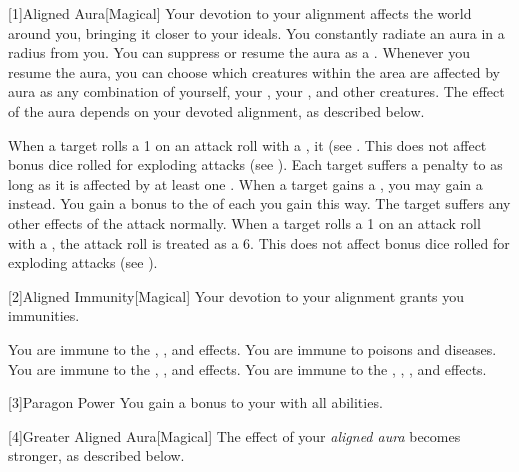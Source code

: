         [1]{Aligned Aura}[Magical]
        Your devotion to your alignment affects the world around you, bringing it closer to your ideals.
        You constantly radiate an aura in a \areamed radius  from you.
        You can suppress or resume the aura as a .
        Whenever you resume the aura, you can choose which creatures within the area are affected by aura as any combination of yourself, your , your , and other creatures.
        The effect of the aura depends on your devoted alignment, as described below.

         When a target rolls a 1 on an attack roll with a , it  (see .
        This does not affect bonus dice rolled for exploding attacks (see ).
         Each target suffers a  penalty to  as long as it is affected by at least one .
         When a target gains a , you may gain a  instead.
        You gain a  bonus to the  of each  you gain this way.
        The target suffers any other effects of the attack normally.
         When a target rolls a 1 on an attack roll with a , the attack roll is treated as a 6.
        This does not affect bonus dice rolled for exploding attacks (see ).

        [2]{Aligned Immunity}[Magical]
        Your devotion to your alignment grants you immunities.

         You are immune to the , , and  effects.
         You are immune to poisons and diseases.
         You are immune to the , , and  effects.
         You are immune to the , , , and  effects.

        [3]{Paragon Power}
        You gain a  bonus to your  with all abilities.

        [4]{Greater Aligned Aura}[Magical]
        The effect of your \textit{aligned aura} becomes stronger, as described below.

